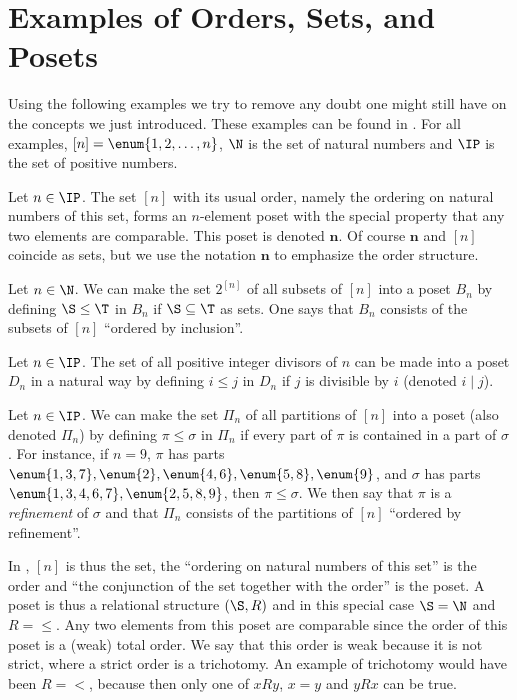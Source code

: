 \section{Examples of Orders, Sets, and Posets}

Using the following examples we try to remove any doubt one might still have on
the concepts we just introduced. These examples can be found in
\citet*{Stanley:2011:ECV:2124415}. For all examples, $[n] = \enum{1, 2,
\ldots, n}$, $\N$ is the set of natural numbers and $\IP$ is the set of
positive numbers.
\begin{example}
\label{ex:poset:def}

\item\label{ex:poset:def:a} Let $n \in \IP$. The set $[n]$ with its usual order,
namely the ordering on natural numbers of this set, forms an $n$-element poset
with the special property that any two elements are comparable. This poset is
denoted $\bm{n}$. Of course $\bm{n}$ and $[n]$ coincide as sets, but we use the
notation $\bm{n}$ to emphasize the order structure.

\item\label{ex:poset:def:b} Let $n \in \N$. We can make the set $2^{[n]}$ of
all subsets of $[n]$ into a poset $B_n$ by defining $\S \leq \T$ in $B_n$ if $\S
\subseteq \T$ as sets. One says that $B_n$ consists of the subsets of $[n]$
``ordered by inclusion''.

\item\label{ex:poset:def:c}  Let $n \in \IP$. The set of all positive integer
divisors of $n$ can be made into a poset $D_n$ in a natural way by defining $i
\leq j$ in $D_n$ if $j$ is divisible by $i$ (denoted $i \mid j$).

\item\label{ex:poset:def:d}  Let $n \in \IP$. We can make the set $\Pi_n$ of all
partitions of $[n]$ into a poset (also denoted $\Pi_n$) by defining $\pi \leq
\sigma$ in $\Pi_n$ if every part of $\pi$ is contained in a part of $\sigma$.
For instance, if $n = 9$, $\pi$ has parts $\enum{1,3,7}, \enum{2}, \enum{4,6},
\enum{5,8}, \enum{9}$, and
$\sigma$ has parts $\enum{1,3,4,6,7}, \enum{2,5,8,9}$, then $\pi \leq \sigma$. We then say that
$\pi$ is a \emph{refinement} of $\sigma$ and that $\Pi_n$ consists of the
partitions of $[n]$ ``ordered by refinement''.
\end{example}

In , $[n]$ is thus the set, the ``ordering on natural
numbers of this set'' is the order and ``the conjunction of the set together
with the order'' is the poset. A poset is thus a relational structure $(\S, R)$
and in this special case $\S = \N$ and $R = \le$. Any two elements from this
poset are comparable since the order of this poset is a (weak) total order. We
say that this order is weak because it is not strict, where a strict order is a
trichotomy. An example of trichotomy would have been $R = <$, because then only
one of $x R y$, $x = y$ and $y R x$ can be true.

